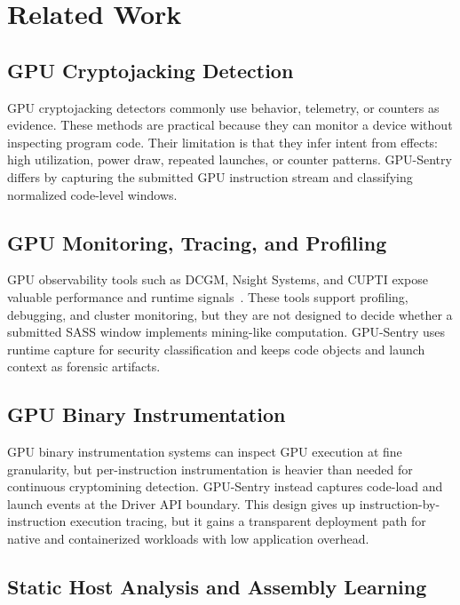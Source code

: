 \section{Related Work}

\subsection{GPU Cryptojacking Detection}

GPU cryptojacking detectors commonly use behavior, telemetry, or counters as evidence. These methods are practical because they can monitor a device without inspecting program code. Their limitation is that they infer intent from effects: high utilization, power draw, repeated launches, or counter patterns. GPU-Sentry differs by capturing the submitted GPU instruction stream and classifying normalized code-level windows.

\subsection{GPU Monitoring, Tracing, and Profiling}

GPU observability tools such as DCGM, Nsight Systems, and CUPTI expose valuable performance and runtime signals~\cite{dcgm,nsight-systems,cutpi}. These tools support profiling, debugging, and cluster monitoring, but they are not designed to decide whether a submitted SASS window implements mining-like computation. GPU-Sentry uses runtime capture for security classification and keeps code objects and launch context as forensic artifacts.

\subsection{GPU Binary Instrumentation}

GPU binary instrumentation systems can inspect GPU execution at fine granularity, but per-instruction instrumentation is heavier than needed for continuous cryptomining detection. GPU-Sentry instead captures code-load and launch events at the Driver API boundary. This design gives up instruction-by-instruction execution tracing, but it gains a transparent deployment path for native and containerized workloads with low application overhead.

\subsection{Static Host Analysis and Assembly Learning}

